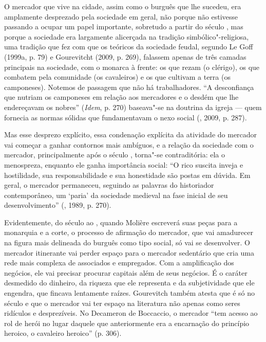 O mercador que vive na cidade, assim como o burguês que lhe sucedeu, era
amplamente desprezado pela sociedade em geral, não porque não estivesse
passando a ocupar um papel importante, sobretudo a partir do século
, mas porque a sociedade era largamente alicerçada na tradição
simbólico"-religiosa, uma tradição que fez com que os teóricos da
sociedade feudal, segundo Le Goff (1999a, p. 79) e Gourevitcht (2009, p.
269), falassem apenas de três camadas principais na sociedade, com o
monarca à frente: os que rezam (o clérigo), os que combatem pela
comunidade (os cavaleiros) e os que cultivam a terra (os camponeses).
Notemos de passagem que não há trabalhadores. ``A desconfiança que
nutriam os camponeses em relação aos mercadores e o desdém que lhe
endereçavam os nobres'' (\emph{Idem}, p. 270) baseava"-se
na doutrina da igreja --- quem fornecia as normas sólidas que
fundamentavam o nexo social (, 2009, p. 287).

Mas esse desprezo explícito, essa condenação explícita da atividade do
mercador vai começar a ganhar contornos mais ambíguos, e a relação da
sociedade com o mercador, principalmente após o século , torna"-se
contraditória: ela o menospreza, enquanto ele ganha importância social:
``O rico suscita inveja e hostilidade, sua responsabilidade e sua
honestidade são postas em dúvida. Em geral, o mercador permaneceu,
seguindo as palavras do historiador contemporâneo, um `paria' da
sociedade medieval na fase inicial de seu desenvolvimento'' (,
1989, p. 270).

Evidentemente, do século  ao , quando Molière escreverá suas
peças para a monarquia e a corte, o processo de afirmação do mercador,
que vai amadurecer na figura mais delineada do burguês como tipo social,
só vai se desenvolver. O mercador itinerante vai perder espaço para o
mercador sedentário que cria uma rede mais complexa de associados e
empregados. Com a amplificação dos negócios, ele vai precisar procurar
capitais além de seus negócios. É
o caráter desmedido do dinheiro, da riqueza que ele representa e da
subjetividade que ele engendra, que fincava lentamente raízes.
Gourevitch também atesta que é só no século  e  que o
mercador vai ter espaço na literatura não apenas como seres ridículos e
desprezíveis. No Decameron de Boccaccio, o mercador ``tem acesso ao rol
de herói no lugar daquele que anteriormente era a encarnação do
princípio heroico, o cavaleiro heroico'' (p. 306).


